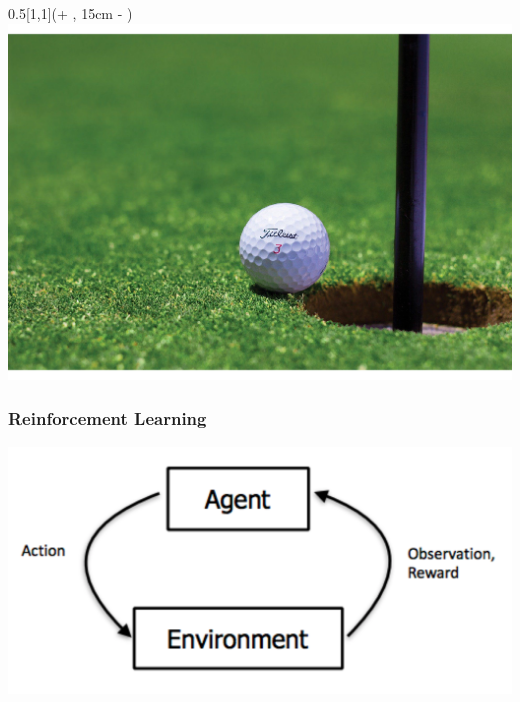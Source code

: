 \begin{frame}
		\begin{textblock*}{0.5\paperwidth}[1,1](\textwidth + \PraesentationSeitenrand, 15cm - \PraesentationSeitenrand)%
			\includegraphics[width=0.5\paperwidth]{./Ressourcen/Figures/golf.pdf}
		\end{textblock*}
	
\end{frame}
\clearpage







\begin{frame}
	\frametitle{Reinforcement Learning}	
	\vspace{1cm}

    \includegraphics[width=\textwidth, height=.55\textheight]{./Ressourcen/Figures/reinforcementlearning.pdf}%

\end{frame}
\clearpage

